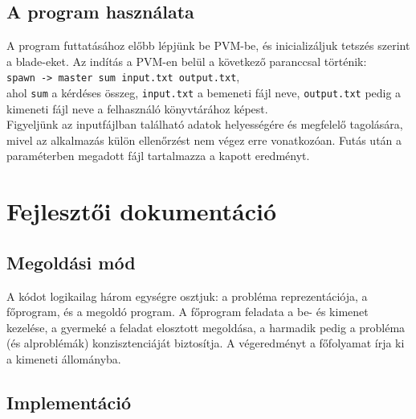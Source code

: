 \documentclass[12pt]{article}
\begin{document}
\subsection{A program használata}

A program futtatásához előbb lépjünk be PVM-be, és inicializáljuk tetszés szerint a blade-eket.
Az indítás a PVM-en belül a következő paranccsal történik:
\\
\verb|spawn -> master sum input.txt output.txt|,
\\
ahol \verb|sum| a kérdéses összeg, \verb|input.txt| a bemeneti fájl neve, \verb|output.txt| pedig
a kimeneti fájl neve a felhasználó könyvtárához képest.
\\
Figyeljünk az inputfájlban található adatok helyességére és megfelelő tagolására, mivel
az alkalmazás külön ellenőrzést nem végez erre vonatkozóan. Futás után a paraméterben megadott
fájl tartalmazza a kapott eredményt.

\section{Fejlesztői dokumentáció}

\subsection{Megoldási mód}

A kódot logikailag három egységre osztjuk: a probléma reprezentációja, a főprogram, és a megoldó
program. A főprogram feladata a be- és kimenet kezelése, a gyermeké a feladat elosztott megoldása,
a harmadik pedig a probléma (és alproblémák) konzisztenciáját biztosítja.
A végeredményt a főfolyamat írja ki a kimeneti állományba.

\subsection{Implementáció}
\end{document}

